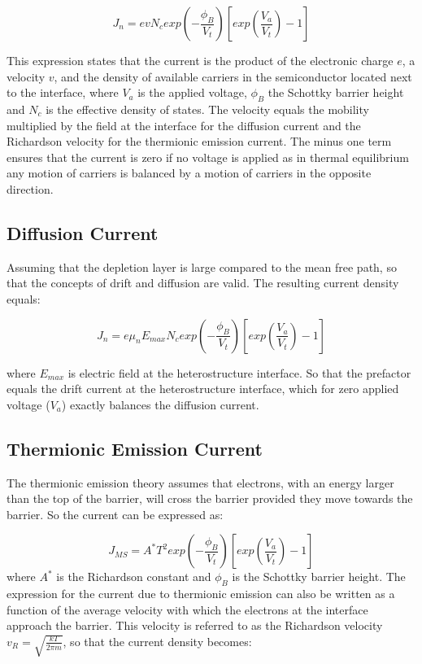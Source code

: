 \documentclass[%
reprint,
amsmath,amssymb,
aps,
]{revtex4-1}
\begin{document}
	\begin{equation}
	J_n = evN_c exp({-\frac{\phi_B}{V_t}})[exp(\frac{V_a}{V_t}) - 1]
	\end{equation}
	
	This expression states that the current is the product of the electronic charge $ e $, a velocity $  v $, and the density of available carriers in the semiconductor located next to the interface, where $ V_a $ is the applied voltage, $ \phi_B $ the Schottky barrier height and $ N_c $ is the effective density of states. The velocity equals the mobility multiplied by the field at the interface for the diffusion current and the Richardson velocity for the thermionic emission current. The minus one term ensures that the current is zero if no voltage is applied as in thermal equilibrium any motion of carriers is balanced by a motion of carriers in the opposite direction.
	
	
	\subsection*{Diffusion Current}
	
	Assuming that the depletion layer is large compared to the mean free path, so that the concepts of drift and diffusion are valid. The resulting current density equals:
	
	\begin{equation}
	J_n = e\mu_n E_{max }N_c exp({-\frac{\phi_B}{V_t}})[exp(\frac{V_a}{V_t}) - 1]
	\end{equation}	
	
	where $ E_{max} $ is electric field at the heterostructure interface. So that the prefactor equals the drift current at the heterostructure interface, which for zero applied voltage ($ V_a $) exactly balances the diffusion current.
	
	\subsection*{Thermionic Emission Current}
	The thermionic emission theory assumes that electrons, with an energy larger than the top of the barrier, will cross the barrier provided they move towards the barrier. So the  current can be expressed as:
	
	\begin{equation}
	J_{MS} = A^* T^2 exp({-\frac{\phi_B}{V_t}})[exp(\frac{V_a}{V_t}) - 1]
	\end{equation}	
	where $ A^* $ is the Richardson constant and $ \phi_B $ is the Schottky barrier height. The expression for the current due to thermionic emission can also be written as a function of the average velocity with which the electrons at the interface approach the barrier. This velocity is referred to as the Richardson velocity $ v_R = \sqrt{\frac{kT}{2\pi m}} $, so that the current density becomes:	
	
\end{document}
